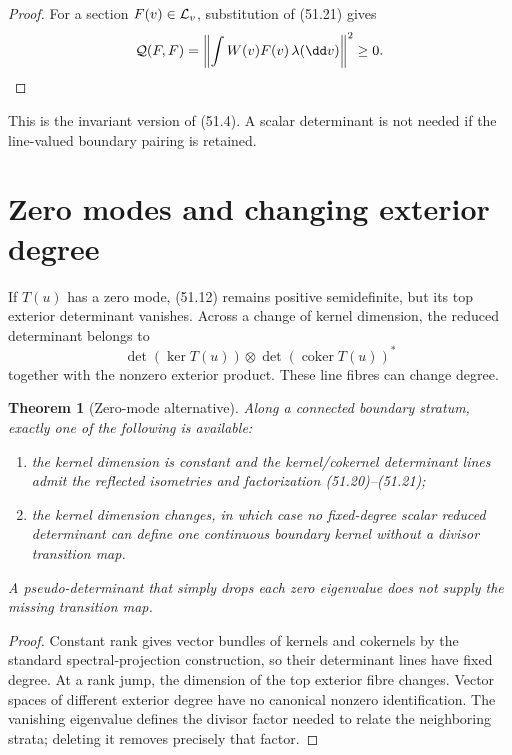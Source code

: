 \documentclass[11pt]{article}
\newtheorem{theorem}{Theorem}[section]
\theoremstyle{remark}
\begin{document}
\begin{proof}
For a section \(F(v)\in{\cal L}_v\), substitution of (51.21) gives
\[
 {\cal Q}(F,F)=
 \left\|\int W(v)F(v)\,\lambda(\dd v)\right\|^2\geq0.
\]
\end{proof}

This is the invariant version of (51.4).  A scalar determinant is
not needed if the line-valued boundary pairing is retained.

\section{Zero modes and changing exterior degree}

If \(T(u)\) has a zero mode, (51.12) remains positive semidefinite,
but its top exterior determinant vanishes.  Across a change of kernel
dimension, the reduced determinant belongs to
\[
 \det(\ker T(u))\otimes\det(\operatorname{coker}T(u))^*
                                                               \tag{51.22}
\]
together with the nonzero exterior product.  These line fibres can
change degree.

\begin{theorem}[Zero-mode alternative]
\label{thm:v15v51-zero}
Along a connected boundary stratum, exactly one of the following is
available:
\begin{enumerate}
\item the kernel dimension is constant and the kernel/cokernel
      determinant lines admit the reflected isometries and
      factorization (51.20)--(51.21);
\item the kernel dimension changes, in which case no fixed-degree
      scalar reduced determinant can define one continuous boundary
      kernel without a divisor transition map.
\end{enumerate}
A pseudo-determinant that simply drops each zero eigenvalue does not
supply the missing transition map.
\end{theorem}

\begin{proof}
Constant rank gives vector bundles of kernels and cokernels by the
standard spectral-projection construction, so their determinant
lines have fixed degree.  At a rank jump, the dimension of the top
exterior fibre changes.  Vector spaces of different exterior degree
have no canonical nonzero identification.  The vanishing eigenvalue
defines the divisor factor needed to relate the neighboring
strata; deleting it removes precisely that factor.
\end{proof}
\end{document}
